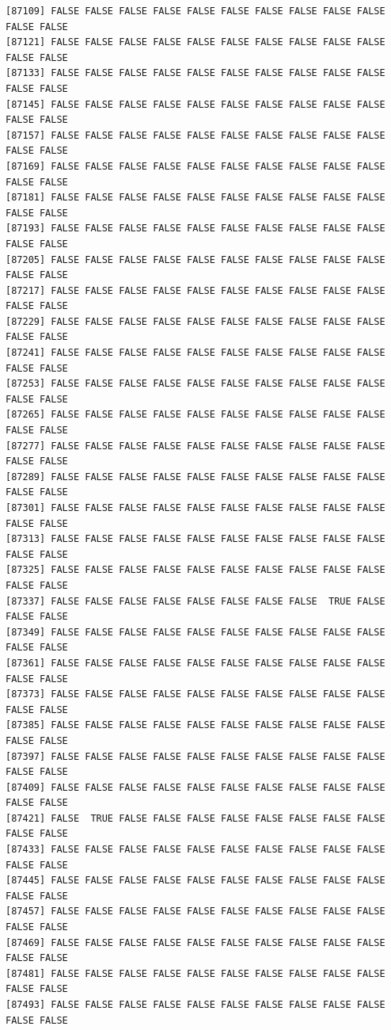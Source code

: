 \documentclass[
  a4paper,
  DIV=11,
  numbers=noendperiod]{scrartcl}
\begin{document}
\begin{verbatim}
[87109] FALSE FALSE FALSE FALSE FALSE FALSE FALSE FALSE FALSE FALSE FALSE FALSE
[87121] FALSE FALSE FALSE FALSE FALSE FALSE FALSE FALSE FALSE FALSE FALSE FALSE
[87133] FALSE FALSE FALSE FALSE FALSE FALSE FALSE FALSE FALSE FALSE FALSE FALSE
[87145] FALSE FALSE FALSE FALSE FALSE FALSE FALSE FALSE FALSE FALSE FALSE FALSE
[87157] FALSE FALSE FALSE FALSE FALSE FALSE FALSE FALSE FALSE FALSE FALSE FALSE
[87169] FALSE FALSE FALSE FALSE FALSE FALSE FALSE FALSE FALSE FALSE FALSE FALSE
[87181] FALSE FALSE FALSE FALSE FALSE FALSE FALSE FALSE FALSE FALSE FALSE FALSE
[87193] FALSE FALSE FALSE FALSE FALSE FALSE FALSE FALSE FALSE FALSE FALSE FALSE
[87205] FALSE FALSE FALSE FALSE FALSE FALSE FALSE FALSE FALSE FALSE FALSE FALSE
[87217] FALSE FALSE FALSE FALSE FALSE FALSE FALSE FALSE FALSE FALSE FALSE FALSE
[87229] FALSE FALSE FALSE FALSE FALSE FALSE FALSE FALSE FALSE FALSE FALSE FALSE
[87241] FALSE FALSE FALSE FALSE FALSE FALSE FALSE FALSE FALSE FALSE FALSE FALSE
[87253] FALSE FALSE FALSE FALSE FALSE FALSE FALSE FALSE FALSE FALSE FALSE FALSE
[87265] FALSE FALSE FALSE FALSE FALSE FALSE FALSE FALSE FALSE FALSE FALSE FALSE
[87277] FALSE FALSE FALSE FALSE FALSE FALSE FALSE FALSE FALSE FALSE FALSE FALSE
[87289] FALSE FALSE FALSE FALSE FALSE FALSE FALSE FALSE FALSE FALSE FALSE FALSE
[87301] FALSE FALSE FALSE FALSE FALSE FALSE FALSE FALSE FALSE FALSE FALSE FALSE
[87313] FALSE FALSE FALSE FALSE FALSE FALSE FALSE FALSE FALSE FALSE FALSE FALSE
[87325] FALSE FALSE FALSE FALSE FALSE FALSE FALSE FALSE FALSE FALSE FALSE FALSE
[87337] FALSE FALSE FALSE FALSE FALSE FALSE FALSE FALSE  TRUE FALSE FALSE FALSE
[87349] FALSE FALSE FALSE FALSE FALSE FALSE FALSE FALSE FALSE FALSE FALSE FALSE
[87361] FALSE FALSE FALSE FALSE FALSE FALSE FALSE FALSE FALSE FALSE FALSE FALSE
[87373] FALSE FALSE FALSE FALSE FALSE FALSE FALSE FALSE FALSE FALSE FALSE FALSE
[87385] FALSE FALSE FALSE FALSE FALSE FALSE FALSE FALSE FALSE FALSE FALSE FALSE
[87397] FALSE FALSE FALSE FALSE FALSE FALSE FALSE FALSE FALSE FALSE FALSE FALSE
[87409] FALSE FALSE FALSE FALSE FALSE FALSE FALSE FALSE FALSE FALSE FALSE FALSE
[87421] FALSE  TRUE FALSE FALSE FALSE FALSE FALSE FALSE FALSE FALSE FALSE FALSE
[87433] FALSE FALSE FALSE FALSE FALSE FALSE FALSE FALSE FALSE FALSE FALSE FALSE
[87445] FALSE FALSE FALSE FALSE FALSE FALSE FALSE FALSE FALSE FALSE FALSE FALSE
[87457] FALSE FALSE FALSE FALSE FALSE FALSE FALSE FALSE FALSE FALSE FALSE FALSE
[87469] FALSE FALSE FALSE FALSE FALSE FALSE FALSE FALSE FALSE FALSE FALSE FALSE
[87481] FALSE FALSE FALSE FALSE FALSE FALSE FALSE FALSE FALSE FALSE FALSE FALSE
[87493] FALSE FALSE FALSE FALSE FALSE FALSE FALSE FALSE FALSE FALSE FALSE FALSE

\end{verbatim}
\end{document}
